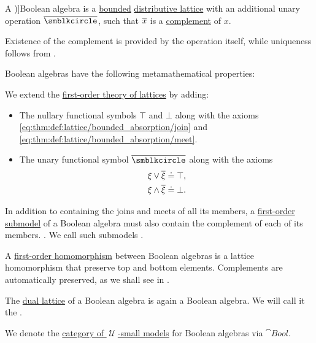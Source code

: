 \begin{definition}\label{def:boolean_algebra}
  A \term[ru=булева алгебра (\cite[def. 1.1]{Гуров2013Решётки})]{Boolean algebra} is a \hyperref[def:extremal_points/bounds]{bounded} \hyperref[def:distributive_lattice]{distributive lattice} with an additional unary operation \( {\oline \anon} \), such that \( {\oline x} \) is a \hyperref[def:bounded_lattice_complement]{complement} of \( x \).

  Existence of the complement is provided by the operation itself, while uniqueness follows from .

  Boolean algebras have the following metamathematical properties:
  \begin{thmenum}
     We extend the \hyperref[def:lattice/theory]{first-order theory of lattices} by adding:
    \begin{itemize}
      \item The nullary functional symbols \( \top \) and \( \bot \) along with the axioms \eqref{eq:thm:def:lattice/bounded_absorption/join} and \eqref{eq:thm:def:lattice/bounded_absorption/meet}.

      \item The unary functional symbol \( {\oline {\anon}} \) along with the axioms
      \begin{align}
        \xi \vee \oline \xi \syneq \top, \label{eq:def:boolean_algebra/join} \\
        \xi \wedge \oline \xi \syneq \bot. \label{eq:def:boolean_algebra/meet}
      \end{align}
    \end{itemize}

     In addition to containing the joins and meets of all its members, a \hyperref[def:first_order_submodel]{first-order submodel} of a Boolean algebra must also contain the complement of each of its members. . We call such submodels .

     A \hyperref[def:first_order_homomorphism]{first-order homomorphism} between Boolean algebras is a lattice homomorphism that preserve top and bottom elements. Complements are automatically preserved, as we shall see in .

     The \hyperref[def:lattice/opposite]{dual lattice} of a Boolean algebra is again a Boolean algebra. We will call it the .

     We denote the \hyperref[def:category_of_small_first_order_models]{category of \( \mscrU \)-small models} for Boolean algebras via \( \cat{Bool} \).
  \end{thmenum}
\end{definition}

